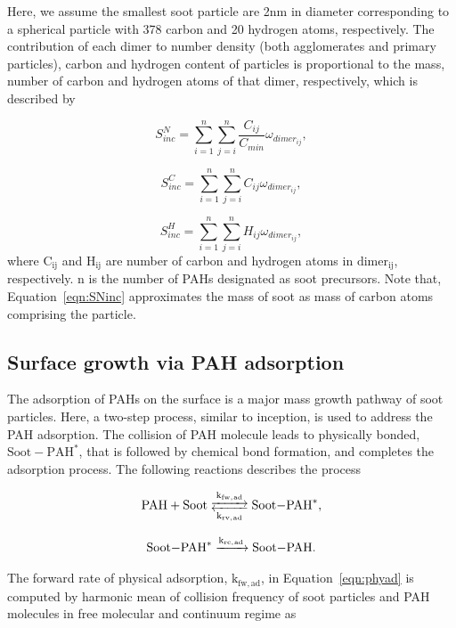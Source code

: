 Here, we assume the smallest soot particle are 2nm in diameter corresponding to a spherical particle with 378 carbon and 20 hydrogen atoms, respectively. The contribution of each dimer to number density (both agglomerates and primary particles), carbon and hydrogen content of particles is proportional to the mass, number of carbon and hydrogen atoms of that dimer, respectively, which is described by

\begin{equation}
	S^N_{inc} = \sum_{i=1}^{n} \sum_{j=i}^{n} \frac{C_{ij}}{C_{min}} \omega_{dimer_{ij}}
	\label{eqn:SNinc},
\end{equation}

\begin{equation}
	S^C_{inc} = \sum_{i=1}^{n} \sum_{j=i}^{n} C_{ij} \omega_{dimer_{ij}}
	\label{eqn:SCinc},
\end{equation}

\begin{equation}
	S^H_{inc} = \sum_{i=1}^{n} \sum_{j=i}^{n} H_{ij} \omega_{dimer_{ij}}
	\label{eqn:SHinc},
\end{equation}
\noindent where $\mathrm{C_{ij}}$ and $\mathrm{H_{ij}}$ are number of carbon and hydrogen atoms in $\mathrm{dimer_{ij}}$, respectively. n is the number of PAHs designated as soot precursors.
Note that, Equation~\eqref{eqn:SNinc} approximates the mass of soot as mass of carbon atoms comprising the particle.

\subsection{Surface growth via PAH adsorption}
The adsorption of PAHs on the surface is a major mass growth pathway of soot particles. Here, a two-step process, similar to inception, is used to address the PAH adsorption. The collision of PAH molecule leads to physically bonded, $\mathrm{Soot-PAH^*}$, that is followed by chemical bond formation, and completes the adsorption process. The following reactions describes the process

\begin{equation}
	\ce{PAH + Soot <-->[k_{fw,ad}][k_{rv,ad}] Soot-PAH^*}
	\label{eqn:phyad},
\end{equation}

\begin{equation}
	\ce{Soot-PAH^* ->[k_{rc,ad}] Soot-PAH}
	\label{eqn:chemad}.
\end{equation}

The forward rate of physical adsorption, $\mathrm{k_{fw,ad}}$, in Equation~\eqref{eqn:phyad} is computed by harmonic mean of collision frequency of soot particles and PAH molecules in free molecular and continuum regime as

